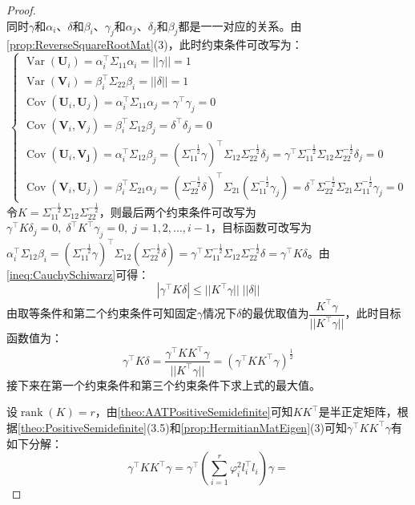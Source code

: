 \begin{proof}
\begin{equation*}
	\end{equation*}
	同时$\gamma$和$\alpha_i$、$\delta$和$\beta_i$、$\gamma_j$和$\alpha_j$、$\delta_j$和$\beta_j$都是一一对应的关系。由\cref{prop:ReverseSquareRootMat}(3)，此时约束条件可改写为：
	\begin{equation*}
		\begin{cases}
			\operatorname{Var}(\mathbf{U}_i)=\alpha_i^{\top}\Sigma_{11}\alpha_i=||\gamma||=1 \\
			\operatorname{Var}(\mathbf{V}_i)=\beta_i^{\top}\Sigma_{22}\beta_i=||\delta||=1 \\
			\operatorname{Cov}(\mathbf{U}_i,\mathbf{U}_j)=\alpha_i^{\top}\Sigma_{11}\alpha_j=\gamma^{\top}\gamma_j=0 \\
			\operatorname{Cov}(\mathbf{V}_i,\mathbf{V}_j)=\beta_i^{\top}\Sigma_{12}\beta_j=\delta^{\top}\delta_j=0 \\
			\operatorname{Cov}(\mathbf{U}_i,\mathbf{V_j})=\alpha_i^{\top}\Sigma_{12}\beta_j=(\Sigma_{11}^{-\frac{1}{2}}\gamma)^{\top}\Sigma_{12}\Sigma_{22}^{-\frac{1}{2}}\delta_j=\gamma^{\top}\Sigma_{11}^{-\frac{1}{2}}\Sigma_{12}\Sigma_{22}^{-\frac{1}{2}}\delta_j=0 \\
			\operatorname{Cov}(\mathbf{V}_i,\mathbf{U}_j)=\beta_i^{\top}\Sigma_{21}\alpha_j=(\Sigma_{22}^{-\frac{1}{2}}\delta)^{\top}\Sigma_{21}(\Sigma_{11}^{-\frac{1}{2}}\gamma_j)=\delta^{\top}\Sigma_{22}^{-\frac{1}{2}}\Sigma_{21}\Sigma_{11}^{-\frac{1}{2}}\gamma_j=0
		\end{cases}
	\end{equation*}
	令$K=\Sigma_{11}^{-\frac{1}{2}}\Sigma_{12}\Sigma_{22}^{-\frac{1}{2}}$，则最后两个约束条件可改写为$\gamma^{\top}K\delta_j=0,\;\delta^{\top}K^{\top}\gamma_j=0,\;j=1,2,\dots,i-1$，目标函数可改写为$\alpha_i^{\top}\Sigma_{12}\beta_i=(\Sigma_{11}^{-\frac{1}{2}}\gamma)^{\top}\Sigma_{12}(\Sigma_{22}^{-\frac{1}{2}}\delta)=\gamma^{\top}\Sigma_{11}^{-\frac{1}{2}}\Sigma_{12}\Sigma_{22}^{-\frac{1}{2}}\delta=\gamma^{\top}K\delta$。由\cref{ineq:CauchySchiwarz}可得：
	\begin{equation*}
		|\gamma^{\top}K\delta|\leqslant||K^{\top}\gamma||\;||\delta||
	\end{equation*}
	由取等条件和第二个约束条件可知固定$\gamma$情况下$\delta$的最优取值为$\dfrac{K^{\top}\gamma}{||K^{\top}\gamma||}$，此时目标函数值为：
	\begin{equation*}
		\gamma^{\top}K\delta=\frac{\gamma^{\top}KK^{\top}\gamma}{||K^{\top}\gamma||}=(\gamma^{\top}KK^{\top}\gamma)^\frac{1}{2}
	\end{equation*}
	接下来在第一个约束条件和第三个约束条件下求上式的最大值。\par
	设$\operatorname{rank}(K)=r$，由\cref{theo:AATPositiveSemidefinite}可知$KK^{\top}$是半正定矩阵，根据\cref{theo:PositiveSemidefinite}(3.5)和\cref{prop:HermitianMatEigen}(3)可知$\gamma^{\top}KK^{\top}\gamma$有如下分解：
	\begin{equation*}
		\gamma^{\top}KK^{\top}\gamma=\gamma^{\top}\left(\sum_{i=1}^{r}\varphi_i^2l_i^{\top}l_i\right)\gamma=
	\end{equation*}
\end{proof}